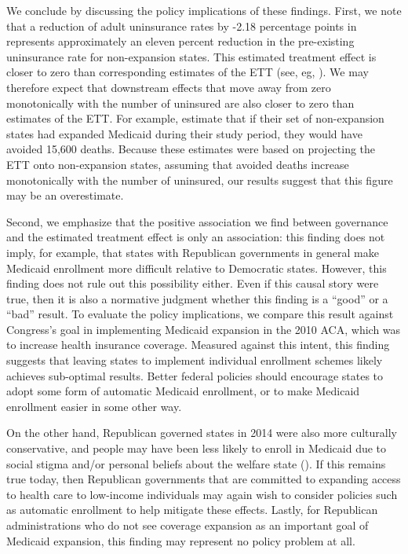 \documentclass[12pt]{article}
\begin{document}
We conclude by discussing the policy implications of these findings. First, we note that a reduction of adult uninsurance rates by -2.18 percentage points in represents approximately an eleven percent reduction in the pre-existing uninsurance rate for non-expansion states. This estimated treatment effect is closer to zero than corresponding estimates of the ETT (see, eg, \cite{courtemanche2017early}). We may therefore expect that downstream effects that move away from zero monotonically with the number of uninsured are also closer to zero than estimates of the ETT. For example, \cite{miller2019medicaid} estimate that if their set of non-expansion states had expanded Medicaid during their study period, they would have avoided 15,600 deaths. Because these estimates were based on projecting the ETT onto non-expansion states, assuming that avoided deaths increase monotonically with the number of uninsured, our results suggest that this figure may be an overestimate.

Second, we emphasize that the positive association we find between governance and the estimated treatment effect is only an association: this finding does not imply, for example, that states with Republican governments in general make Medicaid enrollment more difficult relative to Democratic states. However, this finding does not rule out this possibility either. Even if this causal story were true, then it is also a normative judgment whether this finding is a ``good'' or a ``bad'' result. To evaluate the policy implications, we compare this result against Congress's goal in implementing Medicaid expansion in the 2010 ACA, which was to increase health insurance coverage. Measured against this intent, this finding suggests that leaving states to implement individual enrollment schemes likely achieves sub-optimal results. Better federal policies should encourage states to adopt some form of automatic Medicaid enrollment, or to make Medicaid enrollment easier in some other way.

On the other hand, Republican governed states in 2014 were also more culturally conservative, and people may have been less likely to enroll in Medicaid due to social stigma and/or personal beliefs about the welfare state (\cite{sommers2012understanding}). If this remains true today, then Republican governments that are committed to expanding access to health care to low-income individuals may again wish to consider policies such as automatic enrollment to help mitigate these effects. Lastly, for Republican administrations who do not see coverage expansion as an important goal of Medicaid expansion, this finding may represent no policy problem at all.
\end{document}
